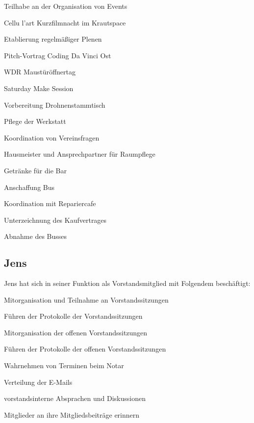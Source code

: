 \documentclass[ngerman]{scrartcl}
\begin{document}
\begin{compactitem}
    \item Teilhabe an der Organisation von Events
    \begin{compactitem}
        \item Cellu l'art Kurzfilmnacht im Krautspace
        \item Etablierung regelmäßiger Plenen
        \item Pitch-Vortrag Coding Da Vinci Ost
        \item WDR Maustüröffnertag
        \item Saturday Make Session
        \item Vorbereitung Drohnenstammtisch
    \end{compactitem}
    \item Pflege der Werkstatt
    \item Koordination von Vereinsfragen
    \item Hausmeister und Ansprechpartner für Raumpflege
    \item Getränke für die Bar
    \item Anschaffung Bus 
    \begin{compactitem}
        \item Koordination mit Repariercafe
        \item Unterzeichnung des Kaufvertrages
        \item Abnahme des Busses
    \end{compactitem}
\end{compactitem}

\subsection{Jens}

Jens hat sich in seiner Funktion als Vorstandsmitglied mit Folgendem 
beschäftigt:

\begin{compactitem}
    \item Mitorganisation und Teilnahme an Vorstandssitzungen
    \item Führen der Protokolle der Vorstandssitzungen
    \item Mitorganisation der offenen Vorstandssitzungen
    \item Führen der Protokolle der offenen Vorstandssitzungen
    \item Wahrnehmen von Terminen beim Notar
    \item Verteilung der E-Mails
    \item vorstandsinterne Absprachen und Diskussionen 
    \item Mitglieder an ihre Mitgliedsbeiträge erinnern
\end{compactitem}
\end{document}
